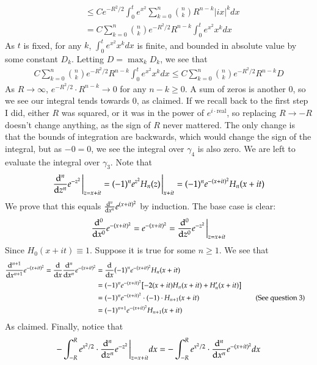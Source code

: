 \documentclass[12pt]{article}
\theoremstyle{definition}
\theoremstyle{remark}
\renewcommand{\leq}{\leqslant}
\renewcommand{\geq}{\geqslant}
\newcommand{\justif}[1]{&\quad &\text{(#1)}}
\begin{document}
\begin{enumerate}[leftmargin=\labelsep]
\begin{align*}
			&\leq Ce^{-R^2/2} \int_0^t e^{x^2} \sum_{k=0}^n {n \choose k} R^{n-k} |ix|^{k}dx \\
			&= C\sum_{k=0}^n {n \choose k} e^{-R^2/2}R^{n-k} \int_0^t e^{x^2} x^{k}dx
		\end{align*}
		As $t$ is fixed, for any $k$, $\int_0^t e^{x^2}x^kdx$ is finite, and bounded in absolute value by some constant $D_k$. Letting $D = \max_{k} D_k$, we see that 
		\begin{align*}
			C\sum_{k=0}^n {n \choose k} e^{-R^2/2}R^{n-k} \int_0^t e^{x^2} x^{k}dx \leq C\sum_{k=0}^n {n \choose k} e^{-R^2/2}R^{n-k} D
		\end{align*}
		As $R \to \infty$, $e^{-R^2/2} \cdot R^{n-k} \to 0$ for any $n-k \geq 0$. A sum of zeros is another 0, so we see our integral tends towards 0, as claimed. If we recall back to the first step I did, either $R$ was squared, or it was in the power of $e^{i \cdot \text{real}}$, so replacing $R \to -R$ doesn't change anything, as the sign of $R$ never mattered. The only change is that the bounds of integration are backwards, which would change the sign of the integral, but as $-0 = 0$, we see the integral over $\gamma_4$ is also zero. We are left to evaluate the integral over $\gamma_3$. Note that 
		\begin{align*}
			\dv[n]{z} e^{-z^2}\eval_{z=x+it}=(-1)^ne^{z^2}H_n(z)\eval_{x+it} = (-1)^ne^{-(x+it)^2}H_n(x+it)
		\end{align*}
		We prove that this equals $\dv[n]{x} e^{(x+it)^2}$ by induction. The base case is clear:
		\begin{align*}
			\dv[0]{x} e^{-(x+it)^2} = e^{-(x+it)^2} = \dv[0]{z} e^{-z^2}\eval_{z=x+it}
		\end{align*}
		Since $H_0(x+it) \equiv 1$.
		Suppose it is true for some $n \geq 1$. We see that
		\begin{align*}
			\dv[n+1]{x} e^{-(x+it)^2} = \dv{x} \dv[n]{x} e^{-(x+it)^2} &= \dv{x} (-1)^ne^{-(x+it)^2}H_n(x+it) \\
			&= (-1)^n e^{-(x+it)^2} \qty[-2(x+it)H_n(x+it)+H_n'(x+it)] \\
			&= (-1)^n e^{-(x+it)^2} \cdot (-1) \cdot H_{n+1}(x+it) \justif{See question 3} \\
			&= (-1)^{n+1} e^{-(x+it)^2} H_{n+1}(x+it)
		\end{align*}
		As claimed. Finally, notice that
		\begin{align*}
			-\int_{-R}^R e^{x^2/2} \cdot \dv[n]{z} e^{-z^2} \eval_{z=x+it} dx &= -\int_{-R}^R e^{x^2/2} \cdot \dv[n]{x} e^{-(x+it)^2}dx \\

\end{align*}
\end{enumerate}
\end{document}
